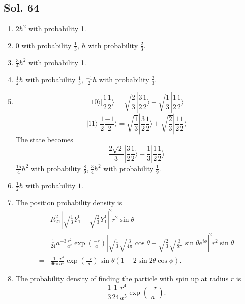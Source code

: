 \subsection*{Sol. 64}
\begin{enumerate}
    \item $2\hbar^2$ with probability 1.
    \item $0$ with probability $\frac{1}{3}$, 
    $\hbar$ with probability $\frac{2}{3}$.
    \item $\frac{3}{4}\hbar^2$ with probability 1.
    \item $\frac{1}{2}\hbar$ with probability $\frac{1}{3}$, 
    $\frac{-1}{2}\hbar$  with probability $\frac{2}{3}$.
    \item 
    $$
    |10\rangle|\frac{1}{2}\frac{1}{2}\rangle = 
    \sqrt{\frac{2}{3}}|\frac{3}{2}\frac{1}{2}\rangle -
    \sqrt{\frac{1}{3}}|\frac{1}{2}\frac{1}{2}\rangle
    $$
    $$
    |11\rangle|\frac{1}{2}\frac{-1}{2}\rangle = 
    \sqrt{\frac{1}{3}}|\frac{3}{2}\frac{1}{2}\rangle +
    \sqrt{\frac{2}{3}}|\frac{1}{2}\frac{1}{2}\rangle
    $$
    The state becomes 
    $$
    \frac{2\sqrt{2}}{3}|\frac{3}{2}\frac{1}{2}\rangle +
    \frac{1}{3}|\frac{1}{2}\frac{1}{2}\rangle
    $$
    $\frac{15}{4}\hbar^2$ with probability $\frac{8}{9}$, 
    $\frac{3}{4}\hbar^2$  with probability $\frac{1}{9}$.
    \item $\frac{1}{2}\hbar$ with probability $1.$
    \item 
    The position probability density is 
    \begin{align*}
        &R_{21}^2\left|\sqrt{\frac{1}{3}}Y^0_1 + \sqrt{\frac{2}{3}}Y^1_1\right|^2r^2\sin\theta\\
        =&
        \frac{1}{24}a^{-3}\frac{r^2}{a^2}\exp(\frac{-r}{a})
        \left|\sqrt{\frac{1}{3}}\sqrt{\frac{3}{4\pi}}\cos\theta -\sqrt{\frac{2}{3}}\sqrt{\frac{3}{8\pi}}
        \sin\theta e^{i\phi}\right|^2
        r^2\sin\theta\\
        =&\frac{1}{96\pi}\frac{r^4}{a^5}
        \exp\left(\frac{-r}{a}\right)\sin\theta
        (1-2\sin2\theta\cos\phi).
        \end{align*}
        \item 
        The probability density of finding the particle with spin up at radius $r$ is 
        $$
        \frac{1}{3}\frac{1}{24}\frac{r^4}{a^5}
        \exp\left(\frac{-r}{a}\right).
        $$
\end{enumerate}

